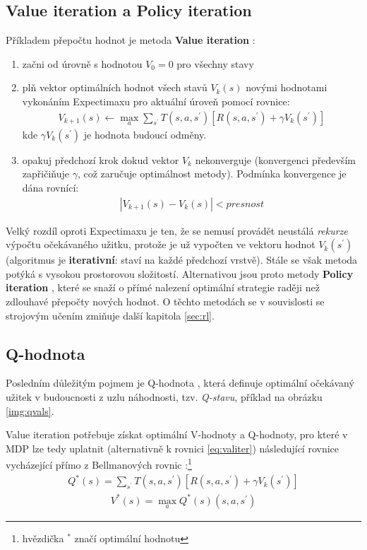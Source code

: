 \subsection{Value iteration a Policy iteration}
\label{teorie:valiter}
Příkladem přepočtu hodnot je metoda \textbf{Value iteration} \cite{RLAprox}:
\begin{enumerate}
\item začni od úrovně s hodnotou $V_{0} = 0$ pro všechny stavy
\item plň vektor optimálních hodnot všech stavů $V_{k}(s)$ novými hodnotami vykonáním Expectimaxu pro aktuální úroveň pomocí rovnice:
\begin{align}
\label{eq:valiter}
V_{k+1}(s) \leftarrow \max_a \sum_{s^\prime}T(s,a,s^\prime) \left[R(s,a,s^\prime)+\gamma V_k(s^\prime) \right]
\end{align}
kde $\gamma V_k(s^\prime)$ je hodnota budoucí odměny.
\item opakuj předchozí krok dokud vektor $V_k$ nekonverguje (konvergenci především zapřičiňuje $\gamma$, což zaručuje optimálnost metody). Podmínka konvergence je dána rovnící:
\begin{align}
\left|V_{k+1}(s)-V_k(s) \right| < presnost
\end{align}
\end{enumerate}
Velký rozdíl oproti Expectimaxu je ten, že se nemusí provádět neustálá \textit{rekurze} výpočtu očekávaného užitku, protože je už vypočten ve vektoru hodnot $V_k(s^\prime)$ (algoritmus je \textbf{iterativní}: staví na každé předchozí vrstvě). Stále se však metoda potýká s vysokou prostorovou složitostí. Alternativou jsou proto metody \textbf{Policy iteration} \cite{RLAprox}, které se snaží o přímé nalezení optimální strategie raději než zdlouhavé přepočty nových hodnot. O těchto metodách se v souvislosti se strojovým učením zmiňuje další kapitola \ref{sec:rl}.

\subsection{Q-hodnota}
\label{teorie:valiterq}
Posledním důležitým pojmem je Q-hodnota \cite{RLIntro}, která definuje optimální očekávaný užitek v budoucnosti z uzlu náhodnosti, tzv. \textit{Q-stavu}, příklad na obrázku \ref{img:qvals}.

Value iteration potřebuje získat optimální V-hodnoty a Q-hodnoty, pro které v MDP lze tedy uplatnit (alternativně k rovnici \ref{eq:valiter}) následující rovnice vycházející přímo z Bellmanových rovnic \cite{mas}:\footnote{hvězdička $^{*}$ značí optimální hodnotu}
\begin{align}
\label{eq:valiter21}
Q^*(s) = \sum_{s^\prime}T(s,a,s^\prime) \left[R(s,a,s^\prime)+\gamma V_k(s^\prime) \right]
\end{align}
\begin{align}
\label{eq:valiter22}
V^*(s) = \max_a Q^*(s) (s,a,s^\prime)
\end{align}


